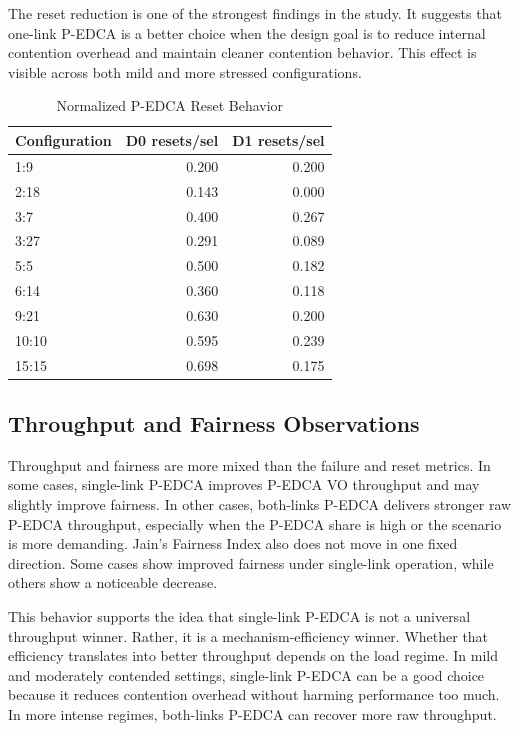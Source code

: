 \documentclass[conference]{IEEEtran}
\begin{document}
The reset reduction is one of the strongest findings in the study. It suggests that one-link P-EDCA is a better choice when the design goal is to reduce internal contention overhead and maintain cleaner contention behavior. This effect is visible across both mild and more stressed configurations.

\begin{table}[t]
\caption{Normalized P-EDCA Reset Behavior}
\label{tab:resets}
\centering
\small
\begin{tabular}{lrr}
\toprule
Configuration & D0 resets/sel & D1 resets/sel \\
\midrule
1:9   & 0.200 & 0.200 \\
2:18  & 0.143 & 0.000 \\
3:7   & 0.400 & 0.267 \\
3:27  & 0.291 & 0.089 \\
5:5   & 0.500 & 0.182 \\
6:14  & 0.360 & 0.118 \\
9:21  & 0.630 & 0.200 \\
10:10 & 0.595 & 0.239 \\
15:15 & 0.698 & 0.175 \\
\bottomrule
\end{tabular}
\end{table}

\subsection{Throughput and Fairness Observations}
Throughput and fairness are more mixed than the failure and reset metrics. In some cases, single-link P-EDCA improves P-EDCA VO throughput and may slightly improve fairness. In other cases, both-links P-EDCA delivers stronger raw P-EDCA throughput, especially when the P-EDCA share is high or the scenario is more demanding. Jain's Fairness Index also does not move in one fixed direction. Some cases show improved fairness under single-link operation, while others show a noticeable decrease.

This behavior supports the idea that single-link P-EDCA is not a universal throughput winner. Rather, it is a mechanism-efficiency winner. Whether that efficiency translates into better throughput depends on the load regime. In mild and moderately contended settings, single-link P-EDCA can be a good choice because it reduces contention overhead without harming performance too much. In more intense regimes, both-links P-EDCA can recover more raw throughput.
\end{document}
